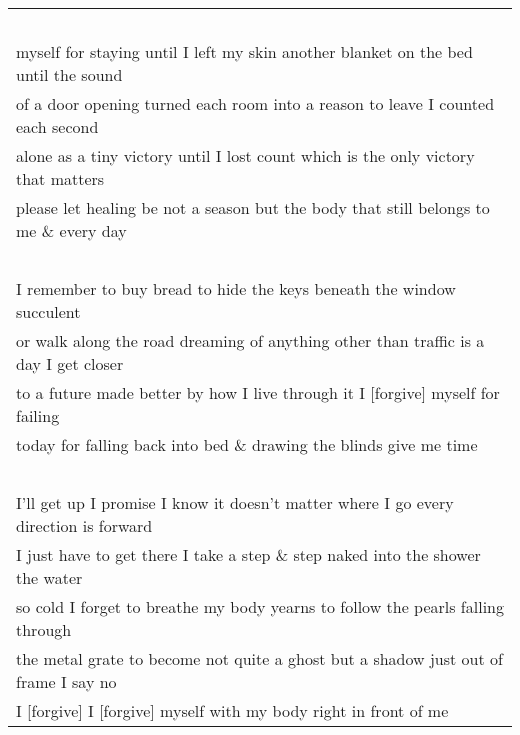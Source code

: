 \begin{center}
\begin{tabular}{l}
\-\ \\ myself for staying \hspace{3mm} until I left my skin \hspace{3mm} another blanket on the bed \hspace{3mm} until the sound\\ 
of a door opening \hspace{3mm} turned each room into a reason to leave \hspace{3mm} I counted each second\\
alone as a tiny victory \hspace{3mm} until I lost count \hspace{3mm} which is the only victory that matters\\ please let healing be not a season \hspace{3mm} but the body that still belongs to me \hspace{3mm} \& every day\\

\-\ \\ I remember to buy bread \hspace{3mm} to hide the keys \hspace{3mm} beneath the window succulent\\ 
or walk along the road dreaming of anything other than traffic \hspace{3mm} is a day I get closer\\
to a future made better by how I live through it \hspace{3mm} I [forgive] myself for failing\\ 
today \hspace{3mm} for falling back into bed \& drawing the blinds \hspace{3mm} give me time\\

\-\ \\ I’ll get up I promise \hspace{3mm} I know it doesn’t matter where I go \hspace{3mm} every direction is forward\\ 
I just have to get there \hspace{3mm} I take a step \hspace{3mm} \& step naked into the shower \hspace{3mm} the water\\
so cold I forget to breathe \hspace{3mm} my body yearns to follow the pearls \hspace{3mm} falling through\\ the metal grate to become not quite a ghost \hspace{3mm} but a shadow just out of frame \hspace{3mm} I say no\\
I [forgive] \hspace{3mm} I [forgive] myself \hspace{3mm} with my body right in front of me
\end{tabular}
\vfill
\end{center}